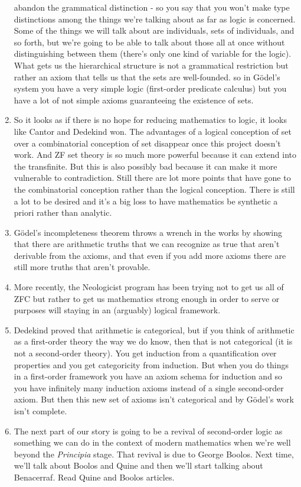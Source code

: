 \documentclass[12pt]{article}
\theoremstyle{definition}
\begin{document}
\begin{enumerate}
        abandon the grammatical distinction - so you say that you won't make
        type distinctions among the things we're talking about as far as logic
        is concerned.  Some of the things we will talk about are individuals,
        sets of individuals, and so forth, but we're going to be able to talk
        about those all at once without distinguishing between them (there's
        only one kind of variable for the logic). What gets us the hierarchical
        structure is not a grammatical restriction but rather an axiom that
        tells us that the sets are well-founded. so in G\"odel's system you
        have a very simple logic (first-order predicate calculus) but you have
        a lot of not simple axioms guaranteeing the existence of sets. 
    \item
        So it looks as if there is no hope for reducing mathematics to logic,
        it looks like Cantor and Dedekind won. The advantages of a logical
        conception of set over a combinatorial conception of set disappear once
        this project doesn't work. And ZF set theory is so much more powerful
        because it can extend into the transfinite. But this is also possibly
        bad because it can make it more vulnerable to contradiction. Still
        there are lot more points that have gone to the combinatorial
        conception rather than the logical conception. There is still a lot to
        be desired and it's a big loss to have mathematics be synthetic a
        priori rather than analytic. 
    \item
        G\"odel's incompleteness theorem throws a wrench in the works by
        showing that there are arithmetic truths that we can recognize as true
        that aren't derivable from the axioms, and that even if you add more
        axioms there are still more truths that aren't provable.
    \item
        More recently, the Neologicist program has been trying not to get us
        all of ZFC but rather to get us mathematics strong enough in order to
        serve or purposes will staying in an (arguably) logical framework.
    \item
        Dedekind proved that arithmetic is categorical, but if you think of
        arithmetic as a first-order theory the way we do know, then that is not
        categorical (it is not a second-order theory). You get induction from a
        quantification over properties and you get categoricity from induction.
        But when you do things in a first-order framework you have an axiom
        schema for induction and so you have infinitely many induction axioms
        instead of a single second-order axiom. But then this new set of axioms
        isn't categorical and by G\"odel's work isn't complete. 
    \item
        The next part of our story is going to be a revival of second-order
        logic as something we can do in the context of modern mathematics when
        we're well beyond the \textit{Principia} stage. That revival is due to
        George Boolos. Next time, we'll talk about Boolos and Quine and then
        we'll start talking about Benacerraf. Read Quine and Boolos articles.


\end{enumerate}
\end{document}
